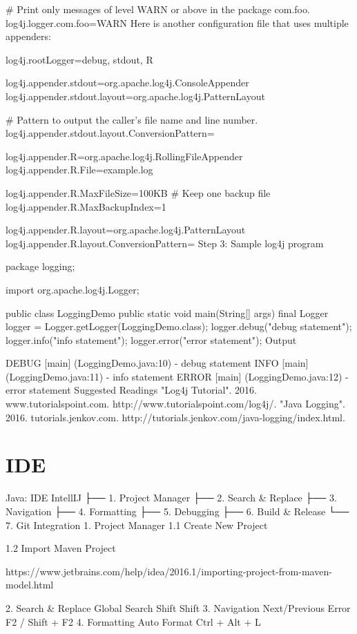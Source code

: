 # Print only messages of level WARN or above in the package com.foo.
log4j.logger.com.foo=WARN
Here is another configuration file that uses multiple appenders:

log4j.rootLogger=debug, stdout, R

log4j.appender.stdout=org.apache.log4j.ConsoleAppender
log4j.appender.stdout.layout=org.apache.log4j.PatternLayout

# Pattern to output the caller's file name and line number.
log4j.appender.stdout.layout.ConversionPattern=%

log4j.appender.R=org.apache.log4j.RollingFileAppender
log4j.appender.R.File=example.log

log4j.appender.R.MaxFileSize=100KB
# Keep one backup file
log4j.appender.R.MaxBackupIndex=1

log4j.appender.R.layout=org.apache.log4j.PatternLayout
log4j.appender.R.layout.ConversionPattern=%
Step 3: Sample log4j program

package logging;

import org.apache.log4j.Logger;

public class LoggingDemo {
    public static void main(String[] args) {
        final Logger logger = Logger.getLogger(LoggingDemo.class);
        logger.debug("debug statement");
        logger.info("info statement");
        logger.error("error statement");
    }
}
Output

DEBUG [main] (LoggingDemo.java:10) - debug statement
 INFO [main] (LoggingDemo.java:11) - info statement
ERROR [main] (LoggingDemo.java:12) - error statement
Suggested Readings
"Log4j Tutorial". 2016. www.tutorialspoint.com. http://www.tutorialspoint.com/log4j/.
"Java Logging". 2016. tutorials.jenkov.com. http://tutorials.jenkov.com/java-logging/index.html.

\section{IDE}

Java: IDE
IntellIJ
├── 1. Project Manager
├── 2. Search & Replace
├── 3. Navigation
├── 4. Formatting
├── 5. Debugging
├── 6. Build & Release
└── 7. Git Integration
1. Project Manager
1.1 Create New Project

1.2 Import Maven Project

https://www.jetbrains.com/help/idea/2016.1/importing-project-from-maven-model.html

2. Search & Replace
Global Search	Shift Shift
3. Navigation
Next/Previous Error	F2 / Shift + F2
4. Formatting
Auto Format	Ctrl + Alt + L


